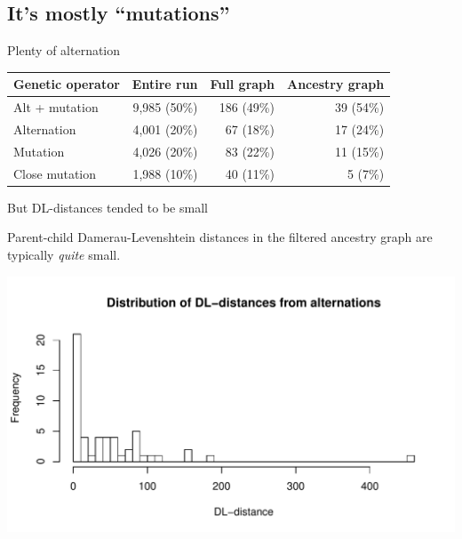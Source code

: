 \documentclass{beamer}
\begin{document}
\subsection{It's mostly ``mutations''}

\begin{frame}{Plenty of alternation}
	\begin{center}
			\begin{tabular}{lrrr}
				\textbf{Genetic operator} & \textbf{Entire run} & \; \textbf{Full graph} & \; \textbf{Ancestry graph} \\ 
				\hline
				Alt + mutation & 9,985 (50\%) & 186 (49\%) & 39 (54\%) \\ 
				Alternation & 4,001 (20\%) & 67 (18\%) & 17 (24\%) \\ 
				Mutation & 4,026 (20\%) & 83 (22\%) & 11 (15\%) \\ 
				Close mutation & 1,988 (10\%) & 40 (11\%) & 5 (7\%)
			\end{tabular} 
	\end{center}
\end{frame}

\begin{frame}{But DL-distances tended to be small}
	
	Parent-child Damerau-Levenshtein distances in the filtered ancestry graph are typically \emph{quite} small.
	
	\vspace{-0.25 cm}
	
	\begin{center}
		\includegraphics[width=\textwidth]{../../figures/Alternation_dl_distance_distribution}
	\end{center}
\end{frame}
\end{document}
